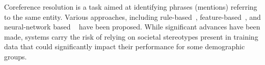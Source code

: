 

 
 





Coreference resolution is a task aimed at identifying phrases (mentions) referring to the same entity. %
Various approaches, including rule-based~\cite{raghunathan2010multi}, feature-based~\cite{DurrettKlein2013,PengChRo15}, and neural-network based ~\cite{clark2016deep,lee2017end} have been proposed. 
While significant advances have been made, systems carry the risk of relying on societal stereotypes present in training data that could significantly impact their performance for some demographic groups.

